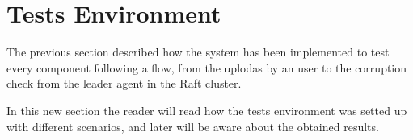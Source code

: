\section{Tests Environment}

The previous section described how the system has been implemented to test every
component following a flow, from the uplodas by an user to the corruption check
from the leader agent in the Raft cluster.

In this new section the reader will read how the tests environment was
setted up with different scenarios, and later will be aware about the obtained
results.
